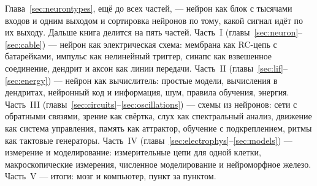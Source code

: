 Глава~\ref{sec:neurontypes}, ещё до всех частей, --- нейрон как блок с тысячами входов и одним выходом и сортировка нейронов по тому, какой сигнал идёт по их выходу. Дальше книга делится на пять частей. Часть~I (главы~\ref{sec:neuron}--\ref{sec:cable}) --- нейрон как электрическая схема: мембрана как RC-цепь с батарейками, импульс как нелинейный триггер, синапс как взвешенное соединение, дендрит и аксон как линии передачи. Часть~II (главы~\ref{sec:lif}--\ref{sec:energy}) --- нейрон как вычислитель: простые модели, вычисления в дендритах, нейронный код и информация, шум, правила обучения, энергия. Часть~III (главы~\ref{sec:circuits}--\ref{sec:oscillations}) --- схемы из нейронов: сети с обратными связями, зрение как свёртка, слух как спектральный анализ, движение как система управления, память как аттрактор, обучение с подкреплением, ритмы как тактовые генераторы. Часть~IV (главы~\ref{sec:electrophys}--\ref{sec:models}) --- измерение и моделирование: измерительные цепи для одной клетки, макроскопические измерения, численное моделирование и нейроморфное железо. Часть~V --- итоги: мозг и компьютер, пункт за пунктом.
